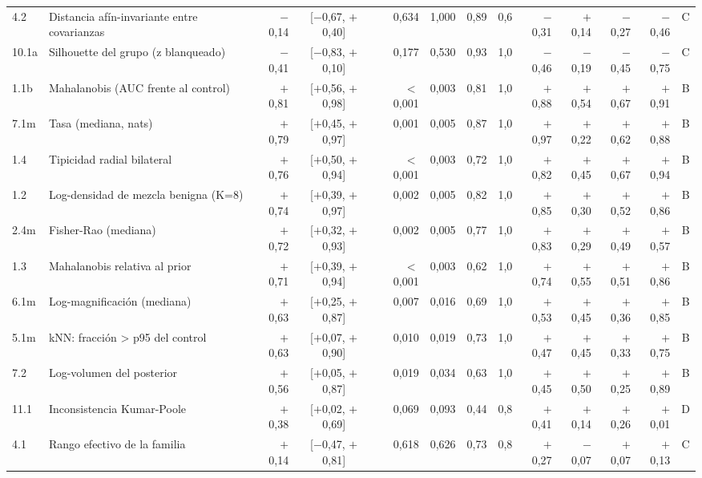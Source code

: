 \begin{longtable}{@{}l>{\raggedright\arraybackslash}p{3.6cm}rcrrrrrrrrc@{}}
4.2 & Distancia afín-invariante entre covarianzas & $-$0{,}14 & [$-$0{,}67, $+$0{,}40] & 0{,}634 & 1{,}000 & 0{,}89 & 0{,}6 & $-$0{,}31 & $+$0{,}14 & $-$0{,}27 & $-$0{,}46 & C \\
10.1a & Silhouette del grupo (z blanqueado) & $-$0{,}41 & [$-$0{,}83, $+$0{,}10] & 0{,}177 & 0{,}530 & 0{,}93 & 1{,}0 & $-$0{,}46 & $-$0{,}19 & $-$0{,}45 & $-$0{,}75 & C \\
1.1b & Mahalanobis (AUC frente al control) & $+$0{,}81 & [$+$0{,}56, $+$0{,}98] & $<$0{,}001 & 0{,}003 & 0{,}81 & 1{,}0 & $+$0{,}88 & $+$0{,}54 & $+$0{,}67 & $+$0{,}91 & B \\
7.1m & Tasa (mediana, nats) & $+$0{,}79 & [$+$0{,}45, $+$0{,}97] & 0{,}001 & 0{,}005 & 0{,}87 & 1{,}0 & $+$0{,}97 & $+$0{,}22 & $+$0{,}62 & $+$0{,}88 & B \\
1.4 & Tipicidad radial bilateral & $+$0{,}76 & [$+$0{,}50, $+$0{,}94] & $<$0{,}001 & 0{,}003 & 0{,}72 & 1{,}0 & $+$0{,}82 & $+$0{,}45 & $+$0{,}67 & $+$0{,}94 & B \\
1.2 & Log-densidad de mezcla benigna (K=8) & $+$0{,}74 & [$+$0{,}39, $+$0{,}97] & 0{,}002 & 0{,}005 & 0{,}82 & 1{,}0 & $+$0{,}85 & $+$0{,}30 & $+$0{,}52 & $+$0{,}86 & B \\
2.4m & Fisher-Rao (mediana) & $+$0{,}72 & [$+$0{,}32, $+$0{,}93] & 0{,}002 & 0{,}005 & 0{,}77 & 1{,}0 & $+$0{,}83 & $+$0{,}29 & $+$0{,}49 & $+$0{,}57 & B \\
1.3 & Mahalanobis relativa al prior & $+$0{,}71 & [$+$0{,}39, $+$0{,}94] & $<$0{,}001 & 0{,}003 & 0{,}62 & 1{,}0 & $+$0{,}74 & $+$0{,}55 & $+$0{,}51 & $+$0{,}86 & B \\
6.1m & Log-magnificación (mediana) & $+$0{,}63 & [$+$0{,}25, $+$0{,}87] & 0{,}007 & 0{,}016 & 0{,}69 & 1{,}0 & $+$0{,}53 & $+$0{,}45 & $+$0{,}36 & $+$0{,}85 & B \\
5.1m & kNN: fracción > p95 del control & $+$0{,}63 & [$+$0{,}07, $+$0{,}90] & 0{,}010 & 0{,}019 & 0{,}73 & 1{,}0 & $+$0{,}47 & $+$0{,}45 & $+$0{,}33 & $+$0{,}75 & B \\
7.2 & Log-volumen del posterior & $+$0{,}56 & [$+$0{,}05, $+$0{,}87] & 0{,}019 & 0{,}034 & 0{,}63 & 1{,}0 & $+$0{,}45 & $+$0{,}50 & $+$0{,}25 & $+$0{,}89 & B \\
11.1 & Inconsistencia Kumar-Poole & $+$0{,}38 & [$+$0{,}02, $+$0{,}69] & 0{,}069 & 0{,}093 & 0{,}44 & 0{,}8 & $+$0{,}41 & $+$0{,}14 & $+$0{,}26 & $+$0{,}01 & D \\
4.1 & Rango efectivo de la familia & $+$0{,}14 & [$-$0{,}47, $+$0{,}81] & 0{,}618 & 0{,}626 & 0{,}73 & 0{,}8 & $+$0{,}27 & $-$0{,}07 & $+$0{,}07 & $+$0{,}13 & C \\

\end{longtable}
